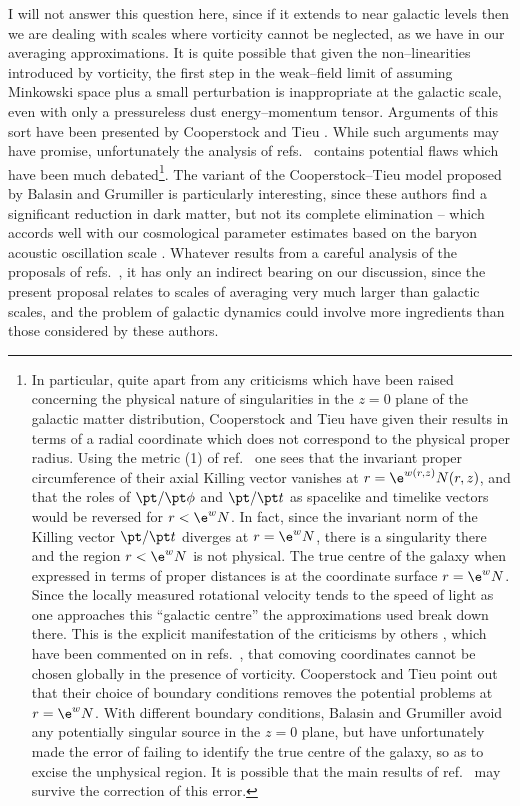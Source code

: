 \documentclass[12pt]{iopart}
\begin{document}
I will not answer this question here, since if it extends to near galactic
levels then we are dealing with scales where vorticity cannot be neglected,
as we have in our averaging approximations. It is quite possible that given
the non--linearities introduced by vorticity, the first step in the
weak--field limit of assuming Minkowski space plus a small perturbation is
inappropriate at the galactic scale, even with only a pressureless dust
energy--momentum tensor. Arguments of this sort have been presented by
Cooperstock and Tieu \cite{CT1,CT2}. While such arguments may have promise,
unfortunately the analysis of refs.\ \cite{CT1,CT2} contains potential
flaws which have been much debated\footnote{In particular, quite apart from
any criticisms which have been raised concerning the physical nature of
singularities in the $z=0$ plane of the galactic matter distribution,
Cooperstock and Tieu have given their results in terms of a
radial coordinate which does not correspond to the physical proper radius.
Using the metric (1) of ref.\ \cite{CT2} one sees that the invariant
proper circumference of their axial Killing vector vanishes at $r=\e^{w(r,z)}
N(r,z)$, and that the roles of $\pt/\pt\phi$ and $\pt/\pt t$ as spacelike
and timelike vectors would be reversed for $r<\e^w N$. In fact, since the
invariant norm of the Killing vector $\pt/\pt t$ diverges at $r=\e^w N$,
there is a singularity there and the region $r<\e^w N$
is not physical. The true centre of the galaxy when expressed in terms
of proper distances is at the coordinate surface $r=\e^w N$. Since the
locally measured rotational velocity tends to the speed of light as one
approaches this ``galactic centre'' the approximations used break down there.
This is the explicit manifestation of the criticisms by others \cite{dust},
which have been commented on in refs.\ \cite{CT1,CT2},
that comoving coordinates cannot be chosen globally in the presence of
vorticity. Cooperstock and Tieu point out that their choice of boundary
conditions removes the potential problems at $r=\e^w N$. With different
boundary conditions, Balasin and Grumiller \cite{BG}
avoid any potentially singular source in
the $z=0$ plane, but have unfortunately made the error of failing to
identify the true centre of the galaxy, so as to excise the unphysical region.
It is possible that the main results of ref.\ \cite{BG} may survive the
correction of this error.}.
The variant of the Cooperstock--Tieu model proposed by Balasin and Grumiller
\cite{BG} is particularly interesting, since these authors find a significant
reduction in dark matter, but not its complete elimination -- which accords
well with our cosmological parameter estimates based on the baryon acoustic
oscillation scale \cite{paper2}.
Whatever results from a careful analysis of the proposals of
refs.\ \cite{CT1,BG}, it has only an indirect bearing on our discussion,
since the present proposal relates to scales of averaging very much
larger than galactic scales, and the problem of galactic dynamics
could involve more ingredients than those considered by these authors.
\end{document}
